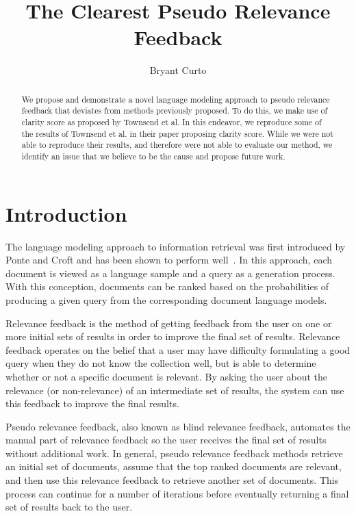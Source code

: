 \documentclass[format=sigconf, screen=true, review=false]{acmart}
\title[The Clearest PRF]{The Clearest Pseudo Relevance Feedback}
\author{Bryant Curto}
\affiliation{
  \institution{University of Waterloo}
  \country{Canada}
}
\begin{document}
 

\begin{abstract}
We propose and demonstrate a novel language modeling approach to pseudo relevance feedback that deviates from methods previously proposed.
To do this, we make use of clarity score as proposed by Townsend et al.
In this endeavor, we reproduce some of the results of Townsend et al. in their paper proposing clarity score.
While we were not able to reproduce their results, and therefore were not able to evaluate our method, we identify an issue that we believe to be the cause and propose future work.
\end{abstract}

\maketitle

\section{Introduction}
The language modeling approach to information retrieval was first introduced by Ponte and Croft and has been shown to perform well~\cite{10.1145/290941.291008}.
In this approach, each  document  is  viewed  as  a language sample  and  a  query  as  a  generation  process.
With this conception, documents can be ranked based on the  probabilities of producing a given query from the corresponding document language models.

Relevance feedback is the method of getting feedback from the user on one or more initial sets of results in order to improve the final set of results.
Relevance feedback operates on the belief that a user may have difficulty formulating a good query when they do not know the collection well, but is able to determine whether or not a specific document is relevant.
By asking the user about the relevance (or non-relevance) of an intermediate set of results, the system can use this feedback to improve the final results.

Pseudo relevance feedback, also known as blind relevance feedback, automates the manual part of relevance feedback so the user receives the final set of results without additional work.
In general, pseudo relevance feedback methods retrieve an initial set of documents, assume that the top ranked documents are relevant, and then use this relevance feedback to retrieve another set of documents.
This process can continue for a number of iterations before eventually returning a final set of results back to the user.
\end{document}
